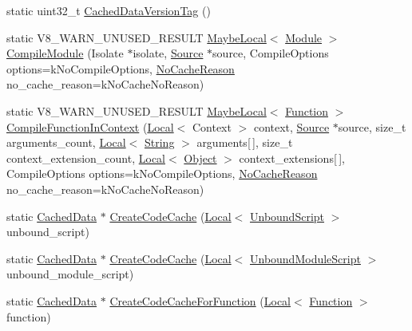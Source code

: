 \begin{DoxyCompactItemize}
\item 
static uint32\+\_\+t \mbox{\hyperlink{classv8_1_1ScriptCompiler_aea78877b0dccde1e587ee1ddeda1c155}{Cached\+Data\+Version\+Tag}} ()
\item 
static V8\+\_\+\+W\+A\+R\+N\+\_\+\+U\+N\+U\+S\+E\+D\+\_\+\+R\+E\+S\+U\+LT \mbox{\hyperlink{classv8_1_1MaybeLocal}{Maybe\+Local}}$<$ \mbox{\hyperlink{classv8_1_1Module}{Module}} $>$ \mbox{\hyperlink{classv8_1_1ScriptCompiler_a7a735ad28cd9925ef67c57a76422116c}{Compile\+Module}} (Isolate $\ast$isolate, \mbox{\hyperlink{classv8_1_1ScriptCompiler_1_1Source}{Source}} $\ast$source, Compile\+Options options=k\+No\+Compile\+Options, \mbox{\hyperlink{classv8_1_1ScriptCompiler_a7f13fa15484cfc500ae51927756e0d60}{No\+Cache\+Reason}} no\+\_\+cache\+\_\+reason=k\+No\+Cache\+No\+Reason)
\item 
static V8\+\_\+\+W\+A\+R\+N\+\_\+\+U\+N\+U\+S\+E\+D\+\_\+\+R\+E\+S\+U\+LT \mbox{\hyperlink{classv8_1_1MaybeLocal}{Maybe\+Local}}$<$ \mbox{\hyperlink{classv8_1_1Function}{Function}} $>$ \mbox{\hyperlink{classv8_1_1ScriptCompiler_ad3e6937d7ea91ac92d22a3f48844fb57}{Compile\+Function\+In\+Context}} (\mbox{\hyperlink{classv8_1_1Local}{Local}}$<$ Context $>$ context, \mbox{\hyperlink{classv8_1_1ScriptCompiler_1_1Source}{Source}} $\ast$source, size\+\_\+t arguments\+\_\+count, \mbox{\hyperlink{classv8_1_1Local}{Local}}$<$ \mbox{\hyperlink{classv8_1_1String}{String}} $>$ arguments\mbox{[}$\,$\mbox{]}, size\+\_\+t context\+\_\+extension\+\_\+count, \mbox{\hyperlink{classv8_1_1Local}{Local}}$<$ \mbox{\hyperlink{classv8_1_1Object}{Object}} $>$ context\+\_\+extensions\mbox{[}$\,$\mbox{]}, Compile\+Options options=k\+No\+Compile\+Options, \mbox{\hyperlink{classv8_1_1ScriptCompiler_a7f13fa15484cfc500ae51927756e0d60}{No\+Cache\+Reason}} no\+\_\+cache\+\_\+reason=k\+No\+Cache\+No\+Reason)
\item 
static \mbox{\hyperlink{structv8_1_1ScriptCompiler_1_1CachedData}{Cached\+Data}} $\ast$ \mbox{\hyperlink{classv8_1_1ScriptCompiler_a3083edf7f887a38f1024d11c0dd7ccdb}{Create\+Code\+Cache}} (\mbox{\hyperlink{classv8_1_1Local}{Local}}$<$ \mbox{\hyperlink{classv8_1_1UnboundScript}{Unbound\+Script}} $>$ unbound\+\_\+script)
\item 
static \mbox{\hyperlink{structv8_1_1ScriptCompiler_1_1CachedData}{Cached\+Data}} $\ast$ \mbox{\hyperlink{classv8_1_1ScriptCompiler_af62a9c3e10c17aec5a99f48bff05f23e}{Create\+Code\+Cache}} (\mbox{\hyperlink{classv8_1_1Local}{Local}}$<$ \mbox{\hyperlink{classv8_1_1UnboundModuleScript}{Unbound\+Module\+Script}} $>$ unbound\+\_\+module\+\_\+script)
\item 
static \mbox{\hyperlink{structv8_1_1ScriptCompiler_1_1CachedData}{Cached\+Data}} $\ast$ \mbox{\hyperlink{classv8_1_1ScriptCompiler_a558a38d3be1394c153dc45e1eb059aa7}{Create\+Code\+Cache\+For\+Function}} (\mbox{\hyperlink{classv8_1_1Local}{Local}}$<$ \mbox{\hyperlink{classv8_1_1Function}{Function}} $>$ function)
\end{DoxyCompactItemize}


